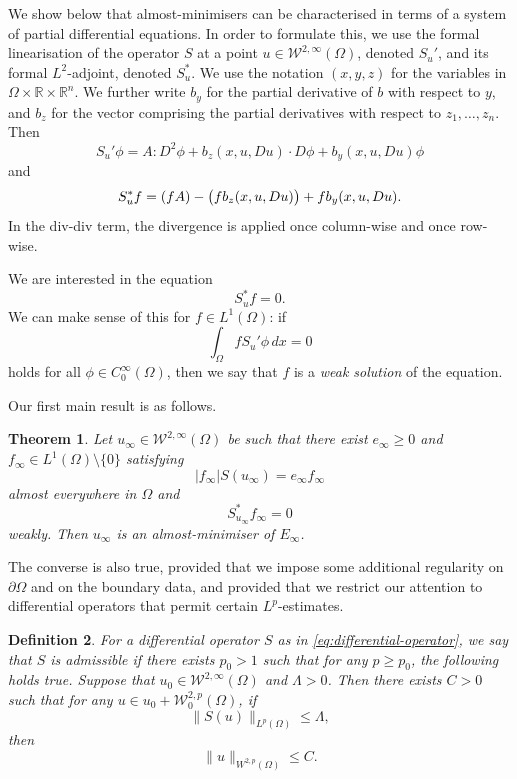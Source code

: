 \documentclass[a4paper]{article}
\newcommand{\R}{\mathbb{R}}
\newcommand{\W}{\mathcal{W}}
\let\div\relax\DeclareMathOperator{\div}{div}
\newtheorem{theorem}{Theorem}
\newtheorem{definition}[theorem]{Definition}
\theoremstyle{remark}
\begin{document}
We show below that almost-minimisers can be characterised in terms of a
system of partial differential equations. In order to formulate this,
we use the formal linearisation of the operator $S$ at a point
$u \in \W^{2, \infty}(\Omega)$, denoted $S_u'$, and its formal $L^2$-adjoint,
denoted $S_u^*$. We use the notation $(x, y, z)$ for the variables
in $\Omega \times \R \times \R^n$. We further write $b_y$ for the partial
derivative of $b$ with respect to $y$, and $b_z$ for the vector comprising
the partial derivatives with respect to $z_1, \dotsc, z_n$. Then
\[
S_u' \phi = A : D^2\phi + b_z(x, u, Du) \cdot D\phi + b_y(x, u, Du)\phi
\]
and
\[
S_u^* f = \div \div (f A) - \div\bigl(f b_z(x, u, Du)\bigr) + f b_y(x, u, Du).
\]
In the div-div term, the divergence is applied once column-wise and once
row-wise.

We are interested in the equation
\begin{equation} \label{eq:S_u^*f=0}
S_u^* f = 0.
\end{equation}
We can make sense
of this for $f \in L^1(\Omega)$: if
\begin{equation} \label{eq:weak-solution}
\int_\Omega f S_u'\phi \, dx = 0
\end{equation}
holds for all $\phi \in C_0^\infty(\Omega)$, then we say that $f$ is a
\emph{weak solution} of the equation.

Our first main result is as follows.

\begin{theorem} \label{thm:sufficiency}
Let $u_\infty \in \W^{2, \infty}(\Omega)$ be
such that there exist $e_\infty \ge 0$ and $f_\infty \in L^1(\Omega) \setminus \{0\}$
satisfying
\begin{equation} \label{eq:Euler-Lagrange1}
|f_\infty| S(u_\infty) = e_\infty f_\infty
\end{equation}
almost everywhere in $\Omega$ and
\begin{equation} \label{eq:Euler-Lagrange2}
S_{u_\infty}^* f_\infty = 0
\end{equation}
weakly. Then $u_\infty$ is an almost-minimiser of $E_\infty$.
\end{theorem}

The converse is also true, provided that we impose some additional regularity
on $\partial \Omega$ and on the boundary data, and provided that we
restrict our attention to differential operators that permit certain
$L^p$-estimates.

\begin{definition} \label{def:admissible}
For a differential operator $S$ as in \eqref{eq:differential-operator},
we say that $S$ is \emph{admissible} if there exists $p_0 > 1$ such that
for any $p \ge p_0$, the following holds true. Suppose that
$u_0 \in \W^{2, \infty}(\Omega)$ and $\Lambda > 0$. Then there exists
$C > 0$ such that for any $u \in u_0 + \W_0^{2, p}(\Omega)$, if
\[
\|S(u)\|_{L^p(\Omega)} \le \Lambda,
\]
then
\[
\|u\|_{W^{2, p}(\Omega)} \le C.
\]
\end{definition}
\end{document}
